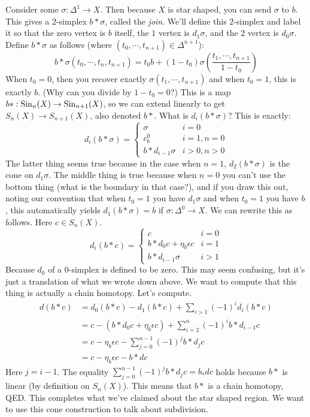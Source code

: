 Consider some $\sigma:\Delta^1\to X$. Then because $X$ is star shaped, you can send $\sigma$ to $b$. This gives a $2$-simplex $b\ast \sigma$, called the \emph{join}. We'll define this $2$-simplex and label it so that the zero vertex is $b$ itself, the $1$ vertex is $d_1\sigma$, and the $2$ vertex is $d_0\sigma$. Define $b\ast\sigma$ as follows (where $(t_0,\cdots,t_{n+1})\in \Delta^{n+1}$):
\begin{equation*}
b\ast\sigma(t_0,\cdots,t_n,t_{n+1})=t_0b + (1-t_0)\sigma\left(\frac{t_1,\cdots,t_{n+1}}{1-t_0}\right)
\end{equation*}
When $t_0=0$, then you recover exactly $\sigma(t_1,\cdots,t_{n+1})$ and when $t_0=1$, this is exactly $b$. (Why can you divide by $1-t_0=0$?) This is a map $b\ast:\mathrm{Sin}_n(X)\to\mathrm{Sin}_{n+1}(X)$, so we can extend linearly to get $S_n(X)\to S_{n+1}(X)$, also denoted $b\ast$. What is $d_i(b\ast\sigma)$? This is exactly:
\begin{equation*}
d_i(b\ast\sigma)=\begin{cases}\sigma & i=0 \\ 
c^0_b & i=1,n=0\\
b\ast d_{i-1}\sigma & i>0,n>0\end{cases}
\end{equation*}
The latter thing seems true because in the case when $n=1$, $d_2(b\ast\sigma)$ is the cone on $d_1\sigma$. The middle thing is true because when $n=0$ you can't use the bottom thing (what is the boundary in that case?), and if you draw this out, noting our convention that when $t_0=1$ you have $d_1\sigma$ and when $t_0=1$ you have $b$, this automatically yields $d_1(b\ast\sigma)=b$ if $\sigma:\Delta^0\to X$. We can rewrite this as follows. Here $c\in S_n(X)$.
\begin{equation*}
d_i(b\ast c)=\begin{cases}
c & i=0\\
b\ast d_0c + \eta_b\epsilon c & i=1\\
b\ast d_{i-1}\sigma & i>1
\end{cases}
\end{equation*}
Because $d_0$ of a $0$-simplex is defined to be zero. This may seem confusing, but it's just a translation of what we wrote down above. We want to compute that this thing is actually a chain homotopy. Let's compute.
\begin{align*}
d(b\ast c)& = d_0(b\ast c) - d_1(b\ast c) + \sum_{i>1}(-1)^i d_i(b\ast c)\\
& = c-(b\ast d_0c + \eta_b\epsilon c) + \sum_{i=2}^n (-1)^ib\ast d_{i-1}c\\
& = c-\eta_b\epsilon c - \sum_{j=0}^{n-1}(-1)^jb\ast d_jc\\
& = c-\eta_b\epsilon c - b\ast dc
\end{align*}
Here $j=i-1$. The equality $\sum_{j=0}^{n-1}(-1)^jb\ast d_jc=b_\ast dc$ holds because $b\ast$ is linear (by definition on $S_n(X)$). This means that $b\ast$ is a chain homotopy, QED. This completes what we've claimed about the star shaped region. We want to use this cone construction to talk about subdivision.
